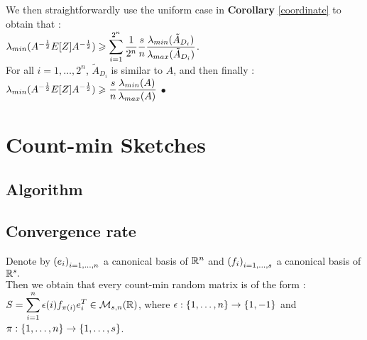 We then straightforwardly use the uniform case in \textbf{Corollary} \ref{coordinate} to obtain that :\\

$\lambda_{min}(A^{-\frac12}E[Z]A^{-\frac12}) \geqslant  \displaystyle\sum\limits_{i=1}^{2^{n}} \frac{1}{ 2^{n}} \frac{s}{n} \frac{\lambda_{min}(\tilde{A}_{D_{i}})}{\lambda_{max}(\tilde{A}_{D_{i}})}$.\\
For all $i = 1,\dots, 2^{n}$, $\tilde{A}_{D_{i}}$ is similar to $A$, and then finally :\\

$\displaystyle \lambda_{min}(A^{-\frac12}E[Z]A^{-\frac12}) \geqslant \frac{s}{n} \frac{\lambda_{min}(A)}{\lambda_{max}(A)}$ $\bullet$




\chapter{Count-min Sketches}

%
%
%

\section{Algorithm}


\section{Convergence rate}


Denote by $\left(e_{i}\right)_{i=1,\dots,n}$ a canonical basis of ${\mathbb R}^{n}$  and $\left(f_{i}\right)_{i=1,\dots,s}$ a canonical basis of ${\mathbb R}^{s}.$\\ 
Then we obtain that every count-min random matrix is of the form : \\
$\displaystyle S = \displaystyle\sum_{i=1}^{n} \displaystyle\epsilon(i) f_{\pi(i)}e_{i}^{T} \in {\mathcal M}_{s,n}({\mathbb R})$, where $\epsilon : \left\{1,\dots,n\right\} \rightarrow \left\{1,-1\right\}$ and $\pi : \left\{1,\dots,n\right\} \rightarrow \left\{1,\dots,s\right\} $.\\

